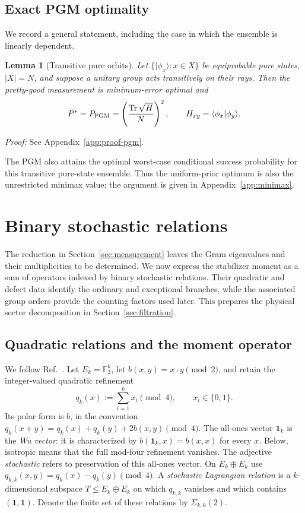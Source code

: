 \documentclass[journal,twocolumn]{IEEEtran}
\newtheorem{lemma}[theorem]{Lemma}
\theoremstyle{definition}
\theoremstyle{plain}
\newcommand{\F}{\mathbb F}
\newcommand{\Tr}{\operatorname{Tr}}
\newcommand{\one}{\bm 1}
\begin{document}
\subsection{Exact PGM optimality}
We record a general statement, including the case in which the ensemble is
linearly dependent.

\begin{lemma}[Transitive pure orbits]
\label{lemS:PGM}
Let $\{|\phi_x\rangle:x\in X\}$ be equiprobable pure states, $|X|=N$, and
suppose a unitary group acts transitively on their rays.  Then the
pretty-good measurement is minimum-error optimal and
\begin{equation}
 P^*=P_{\rm PGM}
 =\left(\frac{\Tr\sqrt H}{N}\right)^2,
 \qquad H_{xy}=\langle\phi_x|\phi_y\rangle.
 \label{eqS:PGMformula}
\end{equation}
\end{lemma}

\noindent\emph{Proof:} See Appendix~\ref{app:proof-pgm}.\par

The PGM also attains the optimal worst-case conditional success
probability for this transitive pure-state ensemble.  Thus the
uniform-prior optimum is also the unrestricted minimax value;
the argument is given in Appendix~\ref{app:minimax}.

\section{Binary stochastic relations}
\label{sec:relations}
The reduction in Section~\ref{sec:measurement} leaves the Gram eigenvalues
and their multiplicities to be determined.  We now express the stabilizer
moment as a sum of operators indexed by binary stochastic relations.
Their quadratic and defect data identify the ordinary and exceptional
branches, while the associated group orders provide the counting factors
used later.  This prepares the physical sector decomposition in
Section~\ref{sec:filtration}.

\subsection{Quadratic relations and the moment operator}
We follow
Ref.~\cite{GrossNezamiWalter2021}.  Let $E_k=\F_2^k$, let
$b(x,y)=x\cdot y\pmod2$, and retain the integer-valued quadratic refinement
\begin{equation}
 q_k(x):=\sum_{i=1}^{k}x_i\pmod4,
 \qquad x_i\in\{0,1\}.
 \label{eqS:quadratic}
\end{equation}
Its polar form is $b$, in the convention
$q_k(x+y)=q_k(x)+q_k(y)+2b(x,y)\pmod4$.  The all-ones vector $\one_k$
is the \emph{Wu vector}: it is characterized by
$b(\one_k,x)=b(x,x)$ for every $x$.  Below, isotropic means that the full
mod-four refinement vanishes.  The adjective \emph{stochastic} refers to
preservation of this all-ones vector.
On $E_k\oplus E_k$ use
$q_{k,k}(x,y)=q_k(x)-q_k(y)\pmod4$.  A \emph{stochastic Lagrangian
relation} is a $k$-dimensional subspace
$T\leq E_k\oplus E_k$ on which $q_{k,k}$ vanishes and which contains
$(\one,\one)$.  Denote the finite set of these relations by
$\Sigma_{k,k}(2)$.
\end{document}
